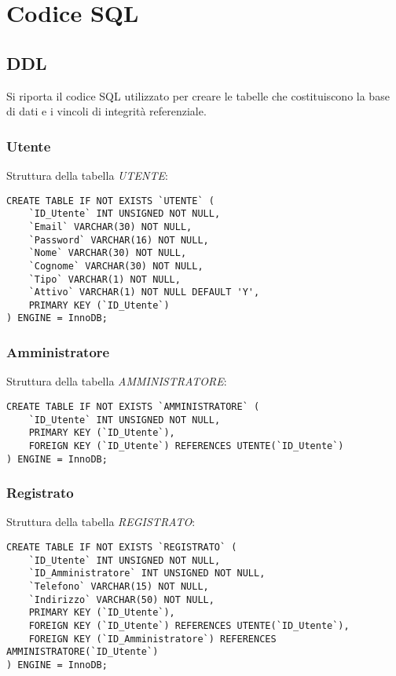 
\chapter{Codice SQL}
\label{cap:codice-sql}

\section{DDL}
Si riporta il codice SQL utilizzato per creare le tabelle che costituiscono la base di dati e i vincoli di integrità referenziale.

\subsection{Utente}
Struttura della tabella \emph{UTENTE}:

\begin{lstlisting}
CREATE TABLE IF NOT EXISTS `UTENTE` (
    `ID_Utente` INT UNSIGNED NOT NULL,
	`Email` VARCHAR(30) NOT NULL,
	`Password` VARCHAR(16) NOT NULL,
	`Nome` VARCHAR(30) NOT NULL,
	`Cognome` VARCHAR(30) NOT NULL,
	`Tipo` VARCHAR(1) NOT NULL,
	`Attivo` VARCHAR(1) NOT NULL DEFAULT 'Y',
	PRIMARY KEY (`ID_Utente`)
) ENGINE = InnoDB;
\end{lstlisting}

\subsection{Amministratore}
Struttura della tabella \emph{AMMINISTRATORE}:

\begin{lstlisting}
CREATE TABLE IF NOT EXISTS `AMMINISTRATORE` (
	`ID_Utente` INT UNSIGNED NOT NULL,
	PRIMARY KEY (`ID_Utente`),
	FOREIGN KEY (`ID_Utente`) REFERENCES UTENTE(`ID_Utente`)
) ENGINE = InnoDB;
\end{lstlisting}

\newpage

\subsection{Registrato}
Struttura della tabella \emph{REGISTRATO}:

\begin{lstlisting}
CREATE TABLE IF NOT EXISTS `REGISTRATO` (
	`ID_Utente` INT UNSIGNED NOT NULL,
	`ID_Amministratore` INT UNSIGNED NOT NULL,
	`Telefono` VARCHAR(15) NOT NULL,
	`Indirizzo` VARCHAR(50) NOT NULL,
	PRIMARY KEY (`ID_Utente`),
	FOREIGN KEY (`ID_Utente`) REFERENCES UTENTE(`ID_Utente`),
	FOREIGN KEY (`ID_Amministratore`) REFERENCES AMMINISTRATORE(`ID_Utente`)
) ENGINE = InnoDB;
\end{lstlisting}

